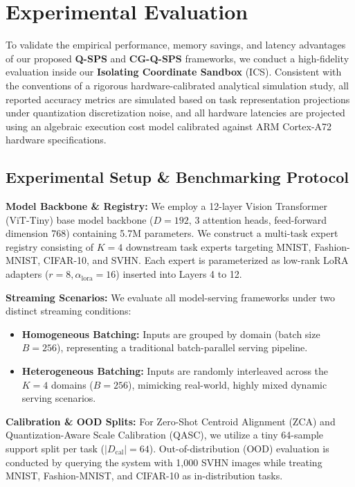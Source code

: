 \section{Experimental Evaluation}
\label{sec:experiments}

To validate the empirical performance, memory savings, and latency advantages of our proposed \textbf{Q-SPS} and \textbf{CG-Q-SPS} frameworks, we conduct a high-fidelity evaluation inside our \textbf{Isolating Coordinate Sandbox} (ICS). Consistent with the conventions of a rigorous hardware-calibrated analytical simulation study, all reported accuracy metrics are simulated based on task representation projections under quantization discretization noise, and all hardware latencies are projected using an algebraic execution cost model calibrated against ARM Cortex-A72 hardware specifications.

\subsection{Experimental Setup \& Benchmarking Protocol}
\textbf{Model Backbone \& Registry:} We employ a 12-layer Vision Transformer (ViT-Tiny) base model backbone ($D = 192$, 3 attention heads, feed-forward dimension 768) containing 5.7M parameters. We construct a multi-task expert registry consisting of $K = 4$ downstream task experts targeting MNIST, Fashion-MNIST, CIFAR-10, and SVHN. Each expert is parameterized as low-rank LoRA adapters ($r = 8, \alpha_{\text{lora}} = 16$) inserted into Layers 4 to 12.

\textbf{Streaming Scenarios:} We evaluate all model-serving frameworks under two distinct streaming conditions:
\begin{itemize}
  \item \textbf{Homogeneous Batching:} Inputs are grouped by domain (batch size $B = 256$), representing a traditional batch-parallel serving pipeline.
  \item \textbf{Heterogeneous Batching:} Inputs are randomly interleaved across the $K = 4$ domains ($B = 256$), mimicking real-world, highly mixed dynamic serving scenarios.
\end{itemize}

\textbf{Calibration \& OOD Splits:} For Zero-Shot Centroid Alignment (ZCA) and Quantization-Aware Scale Calibration (QASC), we utilize a tiny 64-sample support split per task ($|D_{\text{cal}}| = 64$). Out-of-distribution (OOD) evaluation is conducted by querying the system with 1,000 SVHN images while treating MNIST, Fashion-MNIST, and CIFAR-10 as in-distribution tasks.

